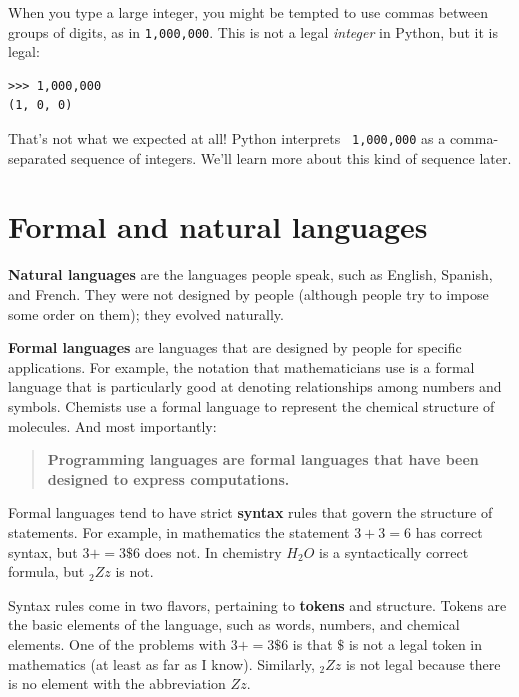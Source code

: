 \documentclass[10pt]{book}
\begin{document}
When you type a large integer, you might be tempted to use commas
between groups of digits, as in {\tt 1,000,000}.  This is not a
legal {\em integer} in Python, but it is legal:

\begin{verbatim}
>>> 1,000,000
(1, 0, 0)
\end{verbatim}
%
That's not what we expected at all!  Python interprets {\tt
  1,000,000} as a comma-separated sequence of integers.  We'll learn
more about this kind of sequence later.




\section{Formal and natural languages}

{\bf Natural languages} are the languages people speak,
such as English, Spanish, and French.  They were not designed
by people (although people try to impose some order on them);
they evolved naturally.

{\bf Formal languages} are languages that are designed by people for
specific applications.  For example, the notation that mathematicians
use is a formal language that is particularly good at denoting
relationships among numbers and symbols.  Chemists use a formal
language to represent the chemical structure of molecules.  And
most importantly:

\begin{quote}
{\bf Programming languages are formal languages that have been
designed to express computations.}
\end{quote}

Formal languages tend to have strict {\bf syntax} rules that
govern the structure of statements.
For example, in mathematics the statement
$3 + 3 = 6$ has correct syntax, but
$3 + = 3 \$ 6$ does not.  In chemistry
$H_2O$ is a syntactically correct formula, but $_2Zz$ is not.

Syntax rules come in two flavors, pertaining to {\bf tokens} and
structure.  Tokens are the basic elements of the language, such as
words, numbers, and chemical elements.  One of the problems with
$3 += 3 \$ 6$ is that \( \$ \) is not a legal token in mathematics
(at least as far as I know).  Similarly, $_2Zz$ is not legal because
there is no element with the abbreviation $Zz$.
\end{document}
